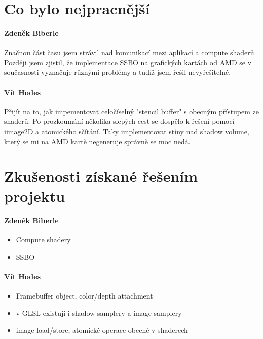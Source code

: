 \documentclass[11pt,a4paper]{article}
\begin{document}
\section{Co bylo nejpracnější}

\paragraph{Zdeněk Biberle}

Značnou část času jsem strávil nad komunikací mezi aplikací a compute shaderů. Později jsem zjistil, že implementace SSBO na grafických kartách od AMD se v současnosti vyznačuje různými problémy a tudíž jsem řešil nevyřešitelné.

\paragraph{Vít Hodes} Přijít na to, jak impementovat celočíselný "stencil buffer" s obecným přístupem ze shaderů. Po prozkoumání několika slepých cest se dospělo k řešení pomocí iimage2D a atomického sčítání. Taky implementovat stíny nad shadow volume, který se mi na AMD kartě negeneruje správně se moc nedá.

\section{Zkušenosti získané řešením projektu}

\paragraph{Zdeněk Biberle}
\begin{itemize}
	\item Compute shadery
	\item SSBO
\end{itemize}

\paragraph{Vít Hodes}
\begin{itemize}
	\item Framebuffer object, color/depth attachment
	\item v GLSL existují i shadow samplery a image samplery
	\item image load/store, atomické operace obecně v shaderech
	
\end{itemize}
\end{document}
